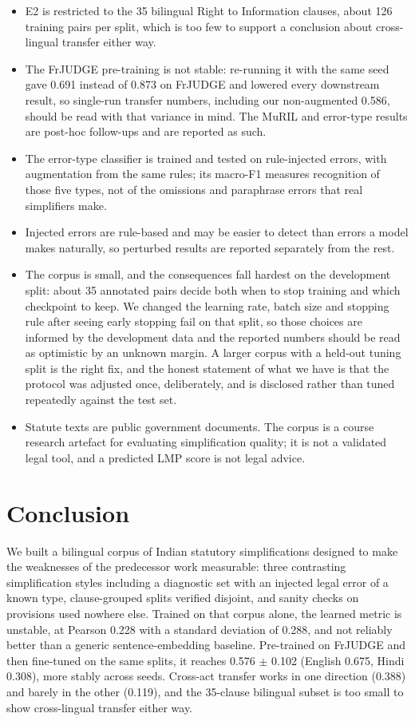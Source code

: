 \documentclass[conference]{IEEEtran}
\begin{document}
\begin{itemize}
\item E2 is restricted to the 35 bilingual Right to Information clauses, about 126 training pairs per split, which is too few to support a conclusion about cross-lingual transfer either way.
\item The FrJUDGE pre-training is not stable: re-running it with the same seed gave 0.691 instead of 0.873 on FrJUDGE and lowered every downstream result, so single-run transfer numbers, including our non-augmented 0.586, should be read with that variance in mind. The MuRIL and error-type results are post-hoc follow-ups and are reported as such.
\item The error-type classifier is trained and tested on rule-injected errors, with augmentation from the same rules; its macro-F1 measures recognition of those five types, not of the omissions and paraphrase errors that real simplifiers make.
\item Injected errors are rule-based and may be easier to detect than errors a model makes naturally, so perturbed results are reported separately from the rest.
\item The corpus is small, and the consequences fall hardest on the development split: about 35 annotated pairs decide both when to stop training and which checkpoint to keep. We changed the learning rate, batch size and stopping rule after seeing early stopping fail on that split, so those choices are informed by the development data and the reported numbers should be read as optimistic by an unknown margin. A larger corpus with a held-out tuning split is the right fix, and the honest statement of what we have is that the protocol was adjusted once, deliberately, and is disclosed rather than tuned repeatedly against the test set.
\item Statute texts are public government documents. The corpus is a course research artefact for evaluating simplification quality; it is not a validated legal tool, and a predicted LMP score is not legal advice.
\end{itemize}

\section{Conclusion}

We built a bilingual corpus of Indian statutory simplifications designed to make the weaknesses of the predecessor work measurable: three contrasting simplification styles including a diagnostic set with an injected legal error of a known type, clause-grouped splits verified disjoint, and sanity checks on provisions used nowhere else. Trained on that corpus alone, the learned metric is unstable, at Pearson 0.228 with a standard deviation of 0.288, and not reliably better than a generic sentence-embedding baseline. Pre-trained on FrJUDGE and then fine-tuned on the same splits, it reaches 0.576 \ensuremath{\pm} 0.102 (English 0.675, Hindi 0.308), more stably across seeds. Cross-act transfer works in one direction (0.388) and barely in the other (0.119), and the 35-clause bilingual subset is too small to show cross-lingual transfer either way.
\end{document}
